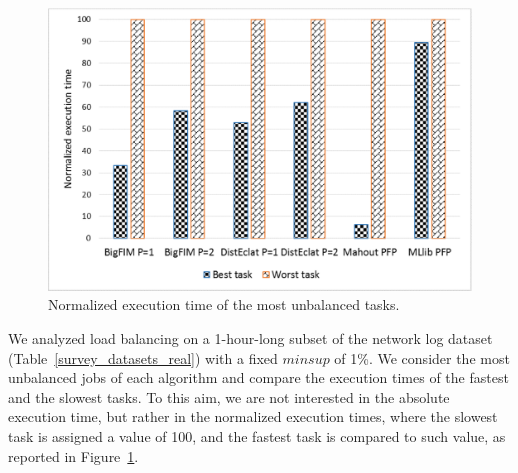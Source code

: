 \begin{figure}[!t]
\begin{center}
\includegraphics[width=5in]{load_balance_big_2.eps}
\caption{Normalized execution time of the most unbalanced tasks.}
\label{survey_load_balance_big}
\end{center}
\end{figure}



We analyzed load balancing on a 1-hour-long subset of the
network log dataset (Table~\ref{survey_datasets_real}) with a fixed $minsup$ of 1\%.
We consider the most unbalanced jobs of each algorithm
and compare the execution times of the fastest and the slowest tasks.
To this aim, we are not interested in the absolute execution time,
but rather in the normalized execution times, where the slowest task is
assigned a value of 100, and the fastest task is compared to such value,
as reported in Figure~\ref{survey_load_balance_big}.

